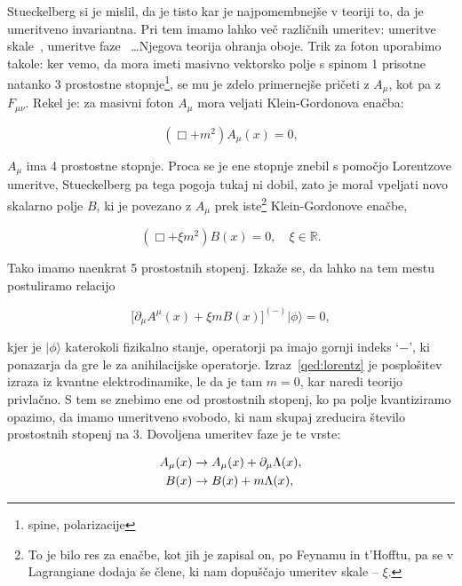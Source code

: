 \documentclass[a4paper, twocolumn, titlepage]{article}
\begin{document}
Stueckelberg si je mislil, da je tisto kar je najpomembnej\v se v teoriji to, da je umeritveno invariantna. Pri tem imamo
lahko ve\v c razli\v cnih umeritev: umeritve skale~\cite{stueckelberg,nieto2}, umeritve faze~\cite{nieto2} \ldots Njegova
teorija ohranja oboje. Trik za foton
uporabimo takole: ker vemo, da mora imeti masivno vektorsko polje s spinom 1 prisotne natanko 3 prostostne
stopnje\footnote{spine, polarizacije}, se mu je zdelo primernej\v se pri\v ceti z $A_\mu$, kot pa z $F_{\mu\nu}$.
Rekel je: za masivni foton $A_\mu$ mora veljati Klein-Gordonova enačba:

\begin{equation}
	(\Box + m^2)A_\mu (x) = 0,
\end{equation}

$A_\mu$ ima
4 prostostne stopnje. Proca se je ene stopnje znebil s pomo\v cjo Lorentzove umeritve, Stueckelberg pa tega pogoja tukaj ni
dobil, zato je moral vpeljati novo skalarno polje $B$, ki je povezano z $A_\mu$ prek iste\footnote{To je bilo res za
enačbe, kot jih je zapisal on, po Feynamu in t'Hofftu, pa se v Lagrangiane dodaja še člene, ki nam dopuščajo umeritev
skale -- $\xi$.} Klein-Gordonove enačbe,

\begin{equation}
	(\Box + \xi m^2)B (x) = 0, \quad \xi \in \mathbb{R}.
	\label{kg}
\end{equation}

Tako imamo naenkrat 5 prostostnih stopenj. Izka\v ze se, da lahko na tem mestu postuliramo relacijo

\begin{equation}
	\big[\partial_\mu A^\mu(x) + \xi mB(x)\big]^{(-)}|\phi\rangle = 0,
	\label{qed:lorentz}
\end{equation}

kjer je $|\phi\rangle$ katerokoli fizikalno stanje, operatorji pa imajo gornji indeks `$-$', ki ponazarja da gre le za
anihilacijske operatorje. Izraz~\eqref{qed:lorentz} je posplošitev izraza iz kvantne elektrodinamike, le da je tam $m = 0$,
kar naredi teorijo privlačno. S tem se znebimo ene od prostostnih stopenj, ko pa polje kvantiziramo opazimo, da imamo
umeritveno svobodo, ki nam skupaj zreducira \v stevilo prostostnih stopenj na 3. Dovoljena umeritev faze je te vrste:

\begin{align}
	A_\mu (x) &\to A_\mu (x) + \partial_\mu \Lambda (x), \notag \\
	B (x) &\to B (x) + m\Lambda(x), 
\end{align}
\end{document}
